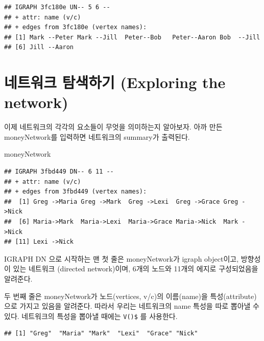 \documentclass[
]{book}
\newenvironment{Shaded}{\begin{snugshade}}{\end{snugshade}}
\newcommand{\FunctionTok}[1]{\textcolor[rgb]{0.00,0.00,0.00}{#1}}
\newcommand{\NormalTok}[1]{#1}
\newcommand{\SpecialCharTok}[1]{\textcolor[rgb]{0.00,0.00,0.00}{#1}}
\begin{document}
\begin{verbatim}
## IGRAPH 3fc180e UN-- 5 6 -- 
## + attr: name (v/c)
## + edges from 3fc180e (vertex names):
## [1] Mark --Peter Mark --Jill  Peter--Bob   Peter--Aaron Bob  --Jill 
## [6] Jill --Aaron
\end{verbatim}

\hypertarget{uxb124uxd2b8uxc6ccuxd06c-uxd0d0uxc0c9uxd558uxae30-exploring-the-network}{%
\section{네트워크 탐색하기 (Exploring the network)}\label{uxb124uxd2b8uxc6ccuxd06c-uxd0d0uxc0c9uxd558uxae30-exploring-the-network}}

이제 네트워크의 각각의 요소들이 무엇을 의미하는지 알아보자.
아까 만든 moneyNetwork를 입력하면 네트워크의 summary가 출력된다.

\begin{Shaded}
\begin{Highlighting}[]
\NormalTok{  moneyNetwork}
\end{Highlighting}
\end{Shaded}

\begin{verbatim}
## IGRAPH 3fbd449 DN-- 6 11 -- 
## + attr: name (v/c)
## + edges from 3fbd449 (vertex names):
##  [1] Greg ->Maria Greg ->Mark  Greg ->Lexi  Greg ->Grace Greg ->Nick 
##  [6] Maria->Mark  Maria->Lexi  Maria->Grace Maria->Nick  Mark ->Nick 
## [11] Lexi ->Nick
\end{verbatim}

IGRAPH DN 으로 시작하는 맨 첫 줄은 moneyNetwork가 igraph object이고, 방향성이 있는 네트워크 (directed network)이며, 6개의 노드와 11개의 에지로 구성되었음을 알려준다.

두 번째 줄은 moneyNetwork가 노드(vertices, v/c)의 이름(name)을 특성(attribute)으로 가지고 있음을 알려준다. 따라서 우리는 네트워크의 name 특성을 따로 뽑아낼 수 있다. 네트워크의 특성을 뽑아낼 때에는 \texttt{V()\$} 를 사용한다.

\begin{Shaded}
\end{Shaded}

\begin{verbatim}
## [1] "Greg"  "Maria" "Mark"  "Lexi"  "Grace" "Nick"
\end{verbatim}
\end{document}
